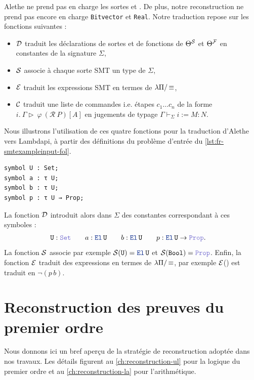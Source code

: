 Alethe ne prend pas en charge les sortes  et . De plus, notre reconstruction ne prend pas encore en charge \texttt{Bitvector} et \texttt{Real}.
Notre traduction repose sur les fonctions suivantes :

\begin{itemize}
\item $\cal{D}$ traduit les déclarations de sortes et de fonctions de $\Theta^\cal{S}$ et $\Theta^\cal{F}$
en constantes de la signature $\Sigma$,
\item $\cal{S}$ associe à chaque sorte SMT un type de $\Sigma$,
\item $\cal{E}$ traduit les expressions SMT en termes de $\lpm$,
\item $\cal{C}$ traduit une liste de commandes i.e. étapes $c_1 \dots c_n$ de la forme $i.~\Gamma \triangleright~\varphi~(\mathcal{R}~P)[A]$ en jugements de typage $\Gamma \vdash_\Sigma i := M: N$.
\end{itemize}

\begin{exemple*}[]

Nous illustrons l'utilisation de ces quatre fonctions pour la traduction d'Alethe vers Lambdapi, à partir des définitions du problème d'entrée du \cref{lst:fr-smtexampleinput-fol}.

\begin{lstlisting}[language=Lambdapi]
symbol U : Set;
symbol a : τ U;
symbol b : τ U;
symbol p : τ U → Prop;
\end{lstlisting}

La fonction $\cal{D}$ introduit alors dans $\Sigma$ des constantes correspondant à ces symboles :
\begin{align*}
&\kw{U} : \set \qquad a : \el\,\kw{U} \qquad b : \el\,\kw{U}
\qquad p : \el\,\kw{U} \ra \prop .
\end{align*}
La fonction $\cal{S}$ associe par exemple $\cal{S}(\kw{U})=\el\,\kw{U}$ et $\cal{S}(\kw{Bool})=\prop$.
Enfin, la fonction $\cal{E}$ traduit des expressions en termes de $\lpm$, par exemple $\cal{E}$() est traduit en $\neg (p\,b)$.
\end{exemple*}



\section*{Reconstruction des preuves du premier ordre}

Nous donnons ici un bref aperçu de la stratégie de reconstruction adoptée dans nos travaux.
Les détails figurent au \cref{ch:reconstruction-ul} pour la logique du premier ordre et au \cref{ch:reconstruction-la} pour l'arithmétique.

